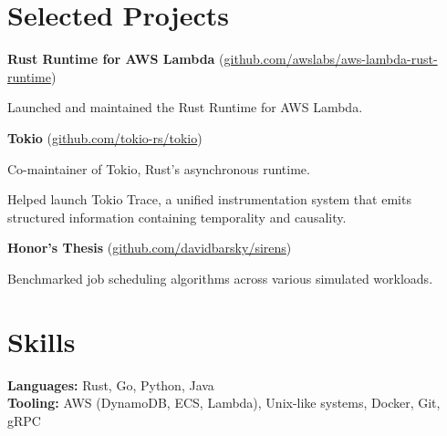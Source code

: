 \documentclass[10pt, a4paper]{article}
\renewenvironment{itemize}[1]{\begin{compactitem}#1}{\end{compactitem}}
\begin{document}
\section*{Selected Projects}


\textbf{Rust Runtime for AWS Lambda} (\href{https://github.com/awslabs/aws-lambda-rust-runtime}{github.com/awslabs/aws-lambda-rust-runtime})
\begin{itemize}
    \item Launched and maintained the Rust Runtime for AWS Lambda.
\end{itemize}

\textbf{Tokio} (\href{https://github.com/tokio-rs/tokio}{github.com/tokio-rs/tokio})
\begin{itemize}
    \item Co-maintainer of Tokio, Rust's asynchronous runtime.
    \item Helped launch Tokio Trace, a unified instrumentation system that emits structured information containing temporality and causality.
\end{itemize}

\textbf{Honor's Thesis} (\href{https://github.com/davidbarsky/sirens}{github.com/davidbarsky/sirens})
\begin{itemize}
    \item Benchmarked job scheduling algorithms across various simulated workloads.
\end{itemize}

\section*{Skills}
\textbf{Languages:} Rust, Go, Python, Java \\
\textbf{Tooling:} AWS (DynamoDB, ECS, Lambda), Unix-like systems, Docker, Git, gRPC
\end{document}
